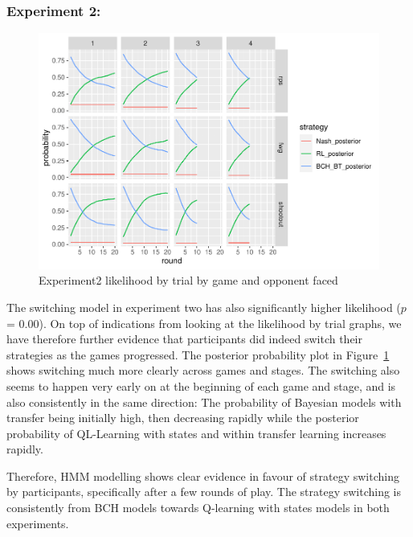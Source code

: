 \documentclass[man,floatsintext]{apa6}
\begin{document}
\hypertarget{experiment-2-2}{%
\subsubsection{Experiment 2:}\label{experiment-2-2}}

\begin{figure}

{\centering \includegraphics{paper_draft_2021_files/figure-latex/exp2-posteriors-plot-1} 

}

\caption{Experiment2 likelihood by trial by game and opponent faced}\label{fig:exp2-posteriors-plot}
\end{figure}

The switching model in experiment two has also significantly higher likelihood (\(p\) = 0.00). On top of indications from looking at the likelihood by trial graphs, we have therefore further evidence that participants did indeed switch their strategies as the games progressed. The posterior probability plot in Figure~\ref{fig:exp2-posteriors-plot} shows switching much more clearly across games and stages. The switching also seems to happen very early on at the beginning of each game and stage, and is also consistently in the same direction: The probability of Bayesian models with transfer being initially high, then decreasing rapidly while the posterior probability of QL-Learning with states and within transfer learning increases rapidly.

Therefore, HMM modelling shows clear evidence in favour of strategy switching by participants, specifically after a few rounds of play. The strategy switching is consistently from BCH models towards Q-learning with states models in both experiments.
\end{document}
